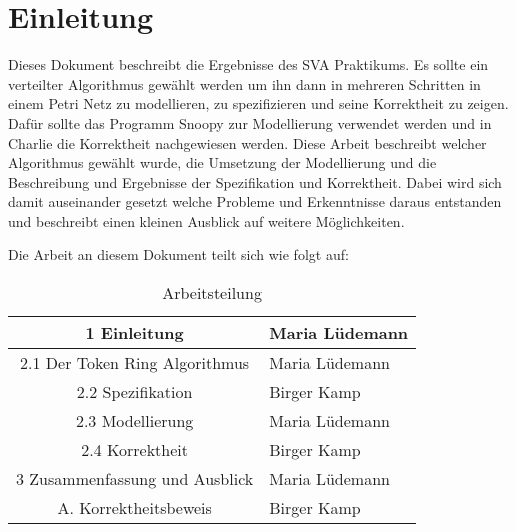 \newpage
\section{Einleitung} 
Dieses Dokument beschreibt die Ergebnisse des SVA Praktikums. Es sollte ein verteilter Algorithmus gewählt werden um ihn dann in mehreren Schritten in einem Petri Netz zu modellieren, zu spezifizieren und seine Korrektheit zu zeigen. Dafür sollte das Programm Snoopy zur Modellierung verwendet werden und in Charlie die Korrektheit nachgewiesen werden. Diese Arbeit beschreibt welcher Algorithmus gewählt wurde, die Umsetzung der Modellierung und die Beschreibung und Ergebnisse der Spezifikation und Korrektheit.
Dabei wird sich damit auseinander gesetzt welche Probleme und Erkenntnisse daraus entstanden und beschreibt einen kleinen Ausblick auf weitere Möglichkeiten.

Die Arbeit an diesem Dokument teilt sich wie folgt auf:

\begin{table}[H]
\centering
 \begin{tabular}{|c|l|}
 \hline
 	1 Einleitung & Maria Lüdemann\\
 \hline
	2.1 Der Token Ring Algorithmus & Maria Lüdemann\\
 \hline
	2.2 Spezifikation & Birger Kamp\\
 \hline
	2.3 Modellierung & Maria Lüdemann\\
 \hline
	2.4 Korrektheit & Birger Kamp\\
 \hline
	3 Zusammenfassung und Ausblick & Maria Lüdemann\\
 \hline
	A. Korrektheitsbeweis & Birger Kamp\\
 \hline		 
 
 \end{tabular}
\caption{Arbeitsteilung}
\end{table}